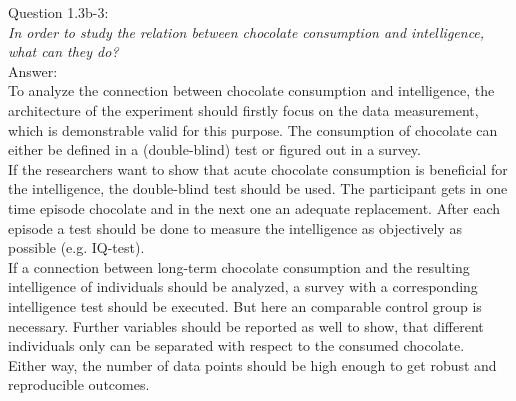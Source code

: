 
Question 1.3b-3:\\	
\textsl{In order to study the relation between chocolate consumption and intelligence, what can they do?}\\

Answer:\\
To analyze the connection between chocolate consumption and intelligence, the architecture of the experiment should firstly focus on the data measurement, which is demonstrable valid for this purpose. The consumption of chocolate can either be defined in a (double-blind) test or figured out in a survey.\\

If the researchers want to show that acute chocolate consumption is beneficial for the intelligence, the double-blind test should be used. The participant gets in one time episode chocolate and in the next one an adequate replacement. After each episode a test should be done to measure the intelligence as objectively as possible (e.g. IQ-test).\\

If a connection between long-term chocolate consumption and the resulting intelligence of individuals should be analyzed, a survey with a corresponding intelligence test should be executed. But here an comparable control group is necessary. Further variables should be reported as well to show, that different individuals only can be separated with respect to the consumed chocolate.\\

Either way, the number of data points should be high enough to get robust and reproducible outcomes.\\


